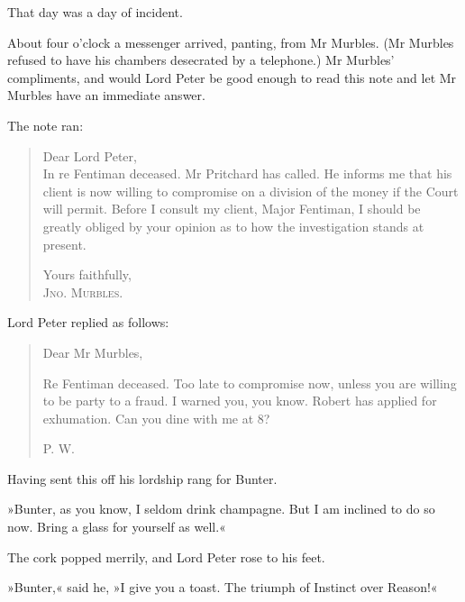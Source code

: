 That day was a day of incident.

About four o'clock a messenger arrived, panting, from Mr Murbles. (Mr Murbles refused to have his chambers desecrated by a telephone.) Mr Murbles' compliments, and would Lord Peter be good enough to read this note and let Mr Murbles have an immediate answer.

The note ran:

\begin{samepage}
\begin{quotation}
\noindent Dear Lord Peter,\\
\nopagebreak[4]
\indent In re Fentiman deceased. Mr Pritchard has called. He informs me that his client is now willing to compromise on a division of the money if the Court will permit. Before I consult my client, Major Fentiman, I should be greatly obliged by your opinion as to how the investigation stands at present.
\begin{flushright}
Yours faithfully,\\
\nopagebreak[4]
\textsc{Jno. Murbles.}
\end{flushright}
\end{quotation}
\end{samepage}

Lord Peter replied as follows:
\begin{samepage}
\begin{quotation}
\noindent Dear Mr Murbles,

\indent Re Fentiman deceased. Too late to compromise now, unless you are willing to be party to a fraud. I warned you, you know. Robert has applied for exhumation. Can you dine with me at 8?
\begin{flushright}
\textsc{P. W.}
\end{flushright}
\end{quotation}
\end{samepage}

Having sent this off his lordship rang for Bunter.

»Bunter, as you know, I seldom drink champagne. But I am inclined to do so now. Bring a glass for yourself as well.«

The cork popped merrily, and Lord Peter rose to his feet.

»Bunter,« said he, »I give you a toast. The triumph of Instinct over Reason!«